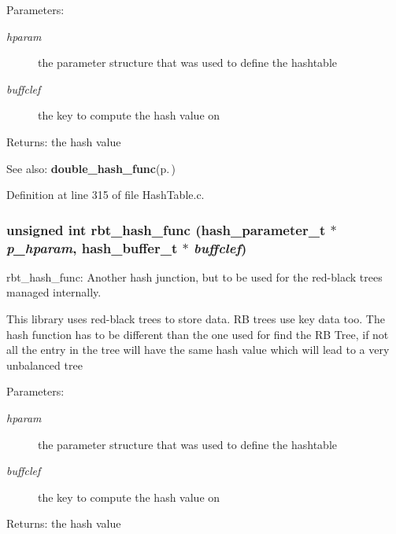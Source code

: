 \begin{Desc}
\item[Parameters:]
\begin{description}
\item[{\em hparam}]the parameter structure that was used to define the hashtable \item[{\em buffclef}]the key to compute the hash value on\end{description}
\end{Desc}
\begin{Desc}
\item[Returns:]the hash value\end{Desc}
\begin{Desc}
\item[See also:]{\bf double\_\-hash\_\-func}{\rm (p.\,\pageref{group__HashTableInternalFunctions_ga1})} \end{Desc}


Definition at line 315 of file Hash\-Table.c.
\subsubsection{\setlength{\rightskip}{0pt plus 5cm}unsigned int rbt\_\-hash\_\-func (hash\_\-parameter\_\-t $\ast$ {\em p\_\-hparam}, hash\_\-buffer\_\-t $\ast$ {\em buffclef})}\label{group__HashTableInternalFunctions_ga2}


rbt\_\-hash\_\-func: Another hash junction, but to be used for the red-black trees managed internally.

This library uses red-black trees to store data. RB trees use key data too. The hash function has to be different than the one used for find the RB Tree, if not all the entry in the tree will have the same hash value which will lead to a very unbalanced tree

\begin{Desc}
\item[Parameters:]
\begin{description}
\item[{\em hparam}]the parameter structure that was used to define the hashtable \item[{\em buffclef}]the key to compute the hash value on\end{description}
\end{Desc}
\begin{Desc}
\item[Returns:]the hash value \end{Desc}


